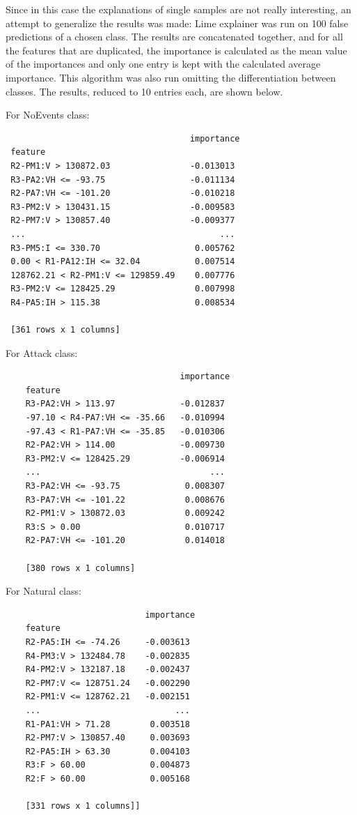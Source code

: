 Since in this case the explanations of single samples are not really interesting, an attempt to generalize the results was made: Lime explainer was run on 100 false predictions of a chosen class. The results are concatenated together, and for all the features that are duplicated, the importance is calculated as the mean value of the importances and only one entry is kept with the calculated average importance. This algorithm was also run omitting the differentiation between classes. The results, reduced to 10 entries each, are shown below.

For NoEvents class:
\begin{verbatim}
                                     importance
 feature                                      
 R2-PM1:V > 130872.03                -0.013013
 R3-PA2:VH <= -93.75                 -0.011134
 R2-PA7:VH <= -101.20                -0.010218
 R3-PM2:V > 130431.15                -0.009583
 R2-PM7:V > 130857.40                -0.009377
 ...                                       ...
 R3-PM5:I <= 330.70                   0.005762
 0.00 < R1-PA12:IH <= 32.04           0.007514
 128762.21 < R2-PM1:V <= 129859.49    0.007776
 R3-PM2:V <= 128425.29                0.007998
 R4-PA5:IH > 115.38                   0.008534
 
 [361 rows x 1 columns]
\end{verbatim}

For Attack class:
\begin{verbatim}
                                   importance
    feature                                 
    R3-PA2:VH > 113.97             -0.012837
    -97.10 < R4-PA7:VH <= -35.66   -0.010994
    -97.43 < R1-PA7:VH <= -35.85   -0.010306
    R2-PA2:VH > 114.00             -0.009730
    R3-PM2:V <= 128425.29          -0.006914
    ...                                  ...
    R3-PA2:VH <= -93.75             0.008307
    R3-PA7:VH <= -101.22            0.008676
    R2-PM1:V > 130872.03            0.009242
    R3:S > 0.00                     0.010717
    R2-PA7:VH <= -101.20            0.014018
    
    [380 rows x 1 columns]
\end{verbatim}

For Natural class: 
\begin{verbatim}
                            importance
    feature                          
    R2-PA5:IH <= -74.26     -0.003613
    R4-PM3:V > 132484.78    -0.002835
    R4-PM2:V > 132187.18    -0.002437
    R2-PM7:V <= 128751.24   -0.002290
    R2-PM1:V <= 128762.21   -0.002151
    ...                           ...
    R1-PA1:VH > 71.28        0.003518
    R2-PM7:V > 130857.40     0.003693
    R2-PA5:IH > 63.30        0.004103
    R3:F > 60.00             0.004873
    R2:F > 60.00             0.005168
    
    [331 rows x 1 columns]]
\end{verbatim}

